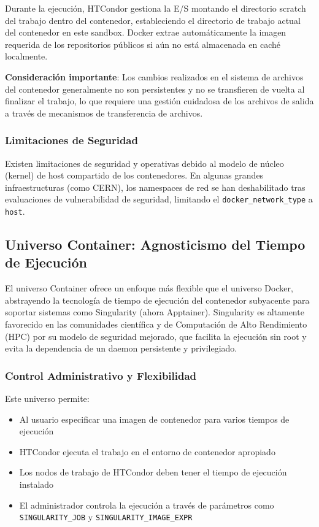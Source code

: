 Durante la ejecución, HTCondor gestiona la E/S montando el directorio scratch del trabajo dentro del contenedor, estableciendo el directorio de trabajo actual del contenedor en este sandbox. Docker extrae automáticamente la imagen requerida de los repositorios públicos si aún no está almacenada en caché localmente.

\textbf{Consideración importante}: Los cambios realizados en el sistema de archivos del contenedor generalmente no son persistentes y no se transfieren de vuelta al finalizar el trabajo, lo que requiere una gestión cuidadosa de los archivos de salida a través de mecanismos de transferencia de archivos.

\subsubsection{Limitaciones de Seguridad}

Existen limitaciones de seguridad y operativas debido al modelo de núcleo (kernel) de host compartido de los contenedores. En algunas grandes infraestructuras (como CERN), los namespaces de red se han deshabilitado tras evaluaciones de vulnerabilidad de seguridad, limitando el \texttt{docker\_network\_type} a \texttt{host}.

\subsection{Universo Container: Agnosticismo del Tiempo de Ejecución}

El universo Container ofrece un enfoque más flexible que el universo Docker, abstrayendo la tecnología de tiempo de ejecución del contenedor subyacente para soportar sistemas como Singularity (ahora Apptainer). Singularity es altamente favorecido en las comunidades científica y de Computación de Alto Rendimiento (HPC) por su modelo de seguridad mejorado, que facilita la ejecución sin root y evita la dependencia de un daemon persistente y privilegiado.

\subsubsection{Control Administrativo y Flexibilidad}

Este universo permite:

\begin{itemize}
	\item Al usuario especificar una imagen de contenedor para varios tiempos de ejecución
	\item HTCondor ejecuta el trabajo en el entorno de contenedor apropiado
	\item Los nodos de trabajo de HTCondor deben tener el tiempo de ejecución instalado
	\item El administrador controla la ejecución a través de parámetros como \texttt{SINGULARITY\_JOB} y \texttt{SINGULARITY\_IMAGE\_EXPR}
\end{itemize}

